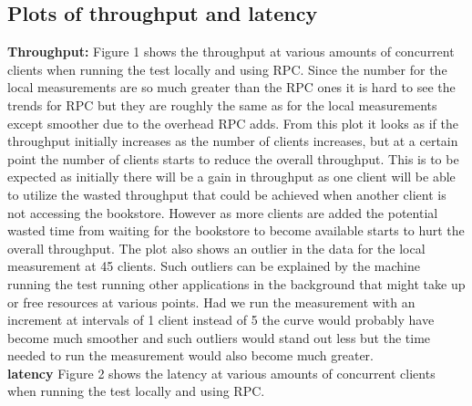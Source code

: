 \documentclass{article}
\theoremstyle{plain}
\theoremstyle{nonumberplain}
\begin{document}
\subsection{Plots of throughput and latency}

\textbf{Throughput:}
Figure 1 shows the throughput at various amounts of concurrent clients when running the test locally and using RPC. Since the number for the local measurements are so much greater than the RPC ones it is hard to see the trends for RPC but they are roughly the same as for the local measurements except smoother due to the overhead RPC adds. From this plot it looks as if the throughput initially increases as the number of clients increases, but at a certain point the number of clients starts to reduce the overall throughput. This is to be expected as initially there will be a gain in throughput as one client will be able to utilize the wasted throughput that could be achieved when another client is not accessing the bookstore. However as more clients are added the potential wasted time from waiting for the bookstore to become available starts to hurt the overall throughput. 
The plot also shows an outlier in the data for the local measurement at 45 clients. Such outliers can be explained by the machine running the test running other applications in the background that might take up or free resources at various points. Had we run the measurement with an increment at intervals of 1 client instead of 5 the curve would probably have become much smoother and such outliers would stand out less but the time needed to run the measurement would also become much greater.\\
\textbf{latency}
 Figure 2 shows the latency at various amounts of concurrent clients when running the test locally and using RPC.
\end{document}
